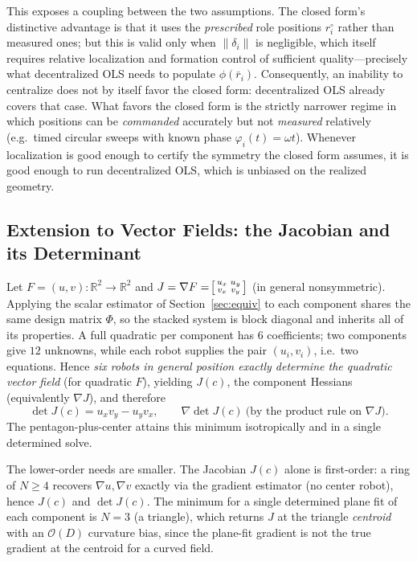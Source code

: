 \documentclass[journal]{IEEEtran}
\newcommand{\R}{\mathbb{R}}
\newcommand{\norm}[1]{\left\lVert #1 \right\rVert}
\begin{document}
This exposes a coupling between the two assumptions. The closed form's distinctive
advantage is that it uses the \emph{prescribed} role positions $r_{i}^{\circ}$
rather than measured ones; but this is valid only when $\norm{\delta_{i}}$ is
negligible, which itself requires relative localization and formation control of
sufficient quality---precisely what decentralized OLS needs to populate
$\phi(\bar r_{i})$. Consequently, an inability to centralize does not by itself
favor the closed form: decentralized OLS already covers that case. What favors the
closed form is the strictly narrower regime in which positions can be
\emph{commanded} accurately but not \emph{measured} relatively (e.g.\ timed
circular sweeps with known phase $\varphi_{i}(t)=\omega t$). Whenever localization
is good enough to certify the symmetry the closed form assumes, it is good enough
to run decentralized OLS, which is unbiased on the realized geometry.

\subsection{Extension to Vector Fields: the Jacobian and its Determinant}
\label{sec:jacobian}

Let $F=(u,v):\R^{2}\to\R^{2}$ and $J=\nabla F=\!\begin{bsmallmatrix}u_{x}&u_{y}\\v_{x}&v_{y}\end{bsmallmatrix}$
(in general nonsymmetric). Applying the scalar estimator of
Section~\ref{sec:equiv} to each component shares the same design matrix $\Phi$, so
the stacked system is block diagonal and inherits all of its properties. A full
quadratic per component has $6$ coefficients; two components give $12$ unknowns,
while each robot supplies the pair $(u_{i},v_{i})$, i.e.\ two equations. Hence
\emph{six robots in general position exactly determine the quadratic vector field}
(for quadratic $F$), yielding $J(c)$, the component Hessians (equivalently
$\nabla J$), and therefore
\begin{equation}
\det J(c)=u_{x}v_{y}-u_{y}v_{x},
\qquad
\nabla\!\det J(c)\ \text{(by the product rule on }\nabla J).
\end{equation}
The pentagon-plus-center attains this minimum isotropically and in a single
determined solve.

The lower-order needs are smaller. The Jacobian $J(c)$ alone is first-order: a
ring of $N\ge4$ recovers $\nabla u,\nabla v$ exactly via the gradient estimator
(no center robot), hence $J(c)$ and $\det J(c)$. The minimum for a single
determined plane fit of each component is $N=3$ (a triangle), which returns $J$ at
the triangle \emph{centroid} with an $\mathcal{O}(D)$ curvature bias, since the
plane-fit gradient is not the true gradient at the centroid for a curved field.
\end{document}
